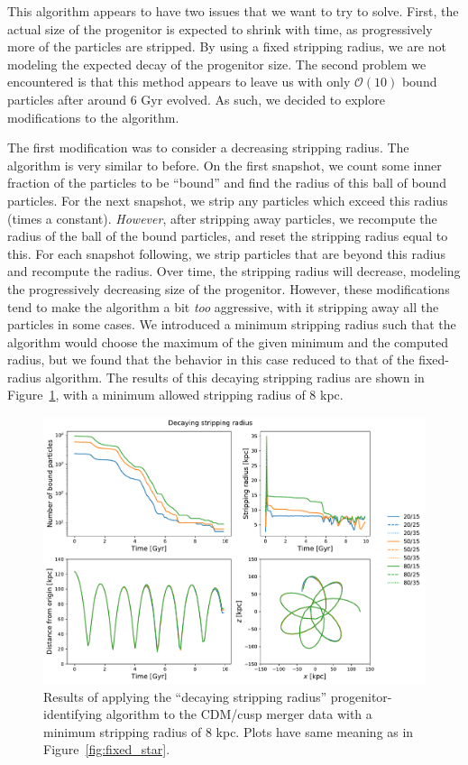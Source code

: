 This algorithm appears to have two issues that we want to try to solve.
First, the actual size of the progenitor is expected to shrink with time, as
progressively more of the particles are stripped.  By using a fixed stripping
radius, we are not modeling the expected decay of the progenitor size.  The
second problem we encountered is that this method appears to leave us with
only $\mathcal{O}(10)$ bound particles after around 6 Gyr evolved.  As such,
we decided to explore modifications to the algorithm.

The first modification was to consider a decreasing stripping radius.  The
algorithm is very similar to before.  On the first snapshot, we count some
inner fraction of the particles to be ``bound'' and find the radius of this
ball of bound particles.  For the next snapshot, we strip any particles
which exceed this radius (times a constant).  \textit{However}, after
stripping away particles, we recompute the radius of the ball of the bound
particles, and reset the stripping radius equal to this. For each snapshot
following, we strip particles that are beyond this radius and recompute the
radius.  Over time, the stripping radius will decrease, modeling the
progressively decreasing size of the progenitor.  However, these modifications
tend to make the algorithm a bit \textit{too} aggressive, with it stripping
away all the particles in some cases.  We introduced a minimum stripping
radius such that the algorithm would choose the maximum of the given minimum and
the computed radius, but we found that the behavior in this case reduced to that
of the fixed-radius algorithm. The results of this decaying stripping radius are
shown in Figure~\ref{fig:decay_star}, with a minimum allowed stripping radius
of 8 kpc.

\begin{figure}
    \centering
    \includegraphics[width=0.9\linewidth]{figs/decay_star.pdf}
    \caption{%
        Results of applying the ``decaying stripping radius''
        progenitor-identifying algorithm to the CDM/cusp merger data with a
        minimum stripping radius of 8 kpc.  Plots have same meaning as in
        Figure~\ref{fig:fixed_star}.
    }
    \label{fig:decay_star}
\end{figure}

